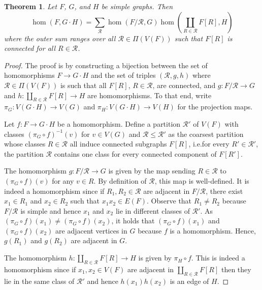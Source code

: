 \documentclass[3p,final]{elsarticle}
\newtheorem{theorem}{Theorem}
\begin{document}
	\begin{theorem} \label{thm:lexprod-hom}
		Let $F$, $G$, and $H$ be simple graphs. Then
		\[
			\hom(F, G \cdot H) = \sum_{\mathcal{R}}
			\hom(F/\mathcal{R}, G) \hom(\coprod_{R \in \mathcal{R}} F[R], H)
		\]
		where the outer sum ranges over all $\mathcal{R} \in \Pi(V(F))$ such that $F[R]$ is connected for all $R \in \mathcal{R}$.
	\end{theorem}
	\begin{proof}The proof is by constructing a bijection between the set of homomorphisms $F \to G \cdot H$ and the set of triples $(\mathcal{R}, g, h)$ where $\mathcal{R} \in \Pi(V(F))$ is such that all $F[R]$, $R \in \mathcal{R}$, are connected, and $g \colon F/\mathcal{R} \to G$ and $h \colon \coprod_{R \in \mathcal{R}} F[R] \to H$ are homomorphisms.
		To that end, write $\pi_G \colon V(G \cdot H) \to V(G)$ and $\pi_H \colon V(G \cdot H) \to V(H)$ for the projection maps. 
		
		Let $f \colon F \to G \cdot H$ be a homomorphism. Define a partition $\mathcal{R}'$ of $V(F)$ with classes $(\pi_G \circ f)^{-1}(v)$ for $v \in V(G)$ and $\mathcal{R} \leq \mathcal{R}'$ as the coarsest partition whose classes $R \in \mathcal{R}$ all induce connected subgraphs $F[R]$, i.e.\@ for every $R' \in \mathcal{R}'$, the partition $\mathcal{R}$ contains one class for every connected component of $F[R']$.
		
		The homomorphism $g \colon F/\mathcal{R} \to G$ is given by the map sending $R \in \mathcal{R}$ to $(\pi_G \circ f)(v)$ for any $v \in R$. By definition of $\mathcal{R}$, this map is well-defined.
		It is indeed a homomorphism since if $R_1, R_2 \in \mathcal{R}$ are adjacent in $F/\mathcal{R}$,  there exist $x_1 \in R_1$ and $x_2 \in R_2$ such that $x_1x_2 \in E(F)$. 
		Observe that $R_1 \neq R_2$ because $F/\mathcal{R}$ is simple and hence $x_1$ and $x_2$ lie in different classes of $\mathcal{R}'$.
		As $(\pi_G \circ f)(x_1) \neq (\pi_G \circ f)(x_2)$, it holds that $(\pi_G \circ f)(x_1)$ and $(\pi_G \circ f)(x_2)$ are adjacent vertices in $G$ because $f$ is a homomorphism. Hence, $g(R_1)$ and $g(R_2)$ are adjacent in $G$.
		
		The homomorphism $h \colon \coprod_{R \in \mathcal{R}} F[R] \to H$ is given by $\pi_H \circ f$.
		This is indeed a homomorphism since if $x_1, x_2 \in V(F)$ are adjacent in $\coprod_{R \in \mathcal{R}} F[R]$ then they lie in the same class of $\mathcal{R}'$ and hence $h(x_1)h(x_2)$ is an edge of $H$.
		

\end{proof}
\end{document}
